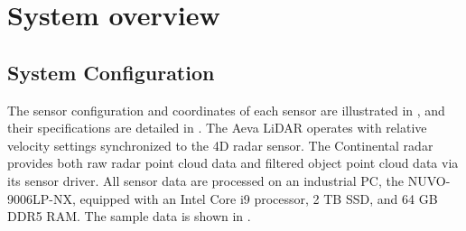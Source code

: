 \section{System overview}
\label{sec:overview}
\subsection{System Configuration}



The sensor configuration and coordinates of each sensor are illustrated in , and their specifications are detailed in . The Aeva \ac{LiDAR} operates with relative velocity settings synchronized to the 4D radar sensor. The Continental radar provides both raw radar point cloud data and filtered object point cloud data via its sensor driver. All sensor data are processed on an industrial PC, the NUVO-9006LP-NX, equipped with an Intel Core i9 processor, 2 TB SSD, and 64 GB DDR5 RAM. The sample data is shown in .

